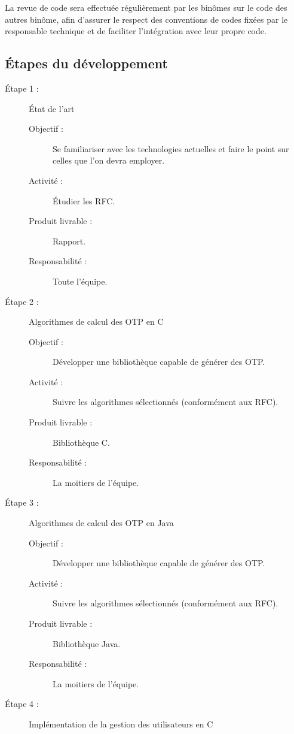 \documentclass{../../res/univ-projet}
\begin{document}
La revue de code sera effectuée régulièrement	par les binômes sur le code des autres binôme, afin d'assurer le respect des conventions de codes fixées par le responsable technique et de faciliter l'intégration avec leur propre code.

\subsection{Étapes du développement}
	\begin{description}
	    \item [Étape 1 :] État de l'art
		    \begin{description}
		        \item [Objectif :] Se familiariser avec les technologies actuelles et faire le point sur celles que l'on devra employer.
		        \item [Activité :] Étudier les RFC.
		        \item [Produit livrable :] Rapport.
		        \item [Responsabilité :] Toute l'équipe.
            \end{description}
	    \item [Étape 2 :] Algorithmes de calcul des OTP en C
		    \begin{description}
		        \item [Objectif :] Développer une bibliothèque capable de générer des OTP.
		        \item [Activité :] Suivre les algorithmes sélectionnés (conformément aux RFC).
		        \item [Produit livrable :] Bibliothèque C.
		        \item [Responsabilité :] La moitiers de l'équipe.
		    \end{description}
	    \item [Étape 3 :] Algorithmes de calcul des OTP en Java
		    \begin{description}
		        \item [Objectif :] Développer une bibliothèque capable de générer des OTP.
		        \item [Activité :] Suivre les algorithmes sélectionnés (conformément aux RFC).
		        \item [Produit livrable :] Bibliothèque Java.
		        \item [Responsabilité :] La moitiers de l'équipe.
		    \end{description}
	    \item [Étape 4 :] Implémentation de la gestion des utilisateurs en C

\end{description}
\end{document}

